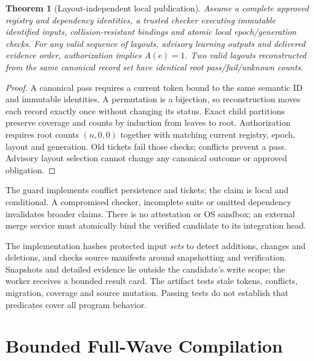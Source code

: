 \documentclass[10pt,journal,compsoc]{IEEEtran}
\newtheorem{theorem}{Theorem}
\theoremstyle{definition}\newtheorem{definition}[theorem]{Definition}
\begin{document}
\begin{theorem}[Layout-independent local publication]\label{thm:jsafety}
Assume a complete approved registry and dependency identities, a trusted
checker executing immutable identified inputs, collision-resistant bindings
and atomic local epoch/generation checks. For any valid sequence of layouts,
advisory learning outputs and delivered evidence order, authorization implies
$A(e)=1$. Two valid layouts reconstructed from the same canonical record set
have identical root pass/fail/unknown counts.
\end{theorem}
\begin{proof}
A canonical pass requires a current token bound to the same semantic ID and
immutable identities. A permutation is a bijection, so reconstruction moves
each record exactly once without changing its status. Exact child partitions
preserve coverage and counts by induction from leaves to root. Authorization
requires root counts $(n,0,0)$ together with matching current registry, epoch,
layout and generation. Old tickets fail those checks; conflicts prevent a
pass. Advisory layout selection cannot change any canonical outcome or
approved obligation.
\end{proof}

The guard implements conflict persistence and tickets; the claim is local
and conditional. A compromised checker, incomplete suite or omitted
dependency invalidates broader claims. There is no attestation or OS sandbox;
an external merge service must atomically bind the verified candidate to its
integration head.

The implementation hashes protected input \emph{sets} to detect additions,
changes and deletions, and checks source manifests around snapshotting and
verification. Snapshots and detailed evidence lie outside the candidate's
write scope; the worker receives a bounded result card. The artifact tests
stale tokens, conflicts, migration, coverage and source mutation. Passing
tests do not establish that predicates cover all program behavior.

\section{Bounded Full-Wave Compilation}\label{sec:jcompiler}
\end{document}
